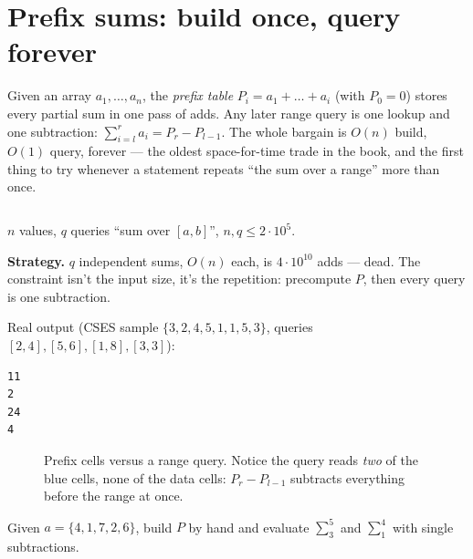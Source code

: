 \section{Prefix sums: build once, query forever}\label{sec:prefix}

Given an array $a_1, \dots, a_n$, the \emph{prefix table} $P_i = a_1 +
\dots + a_i$ (with $P_0 = 0$) stores every partial sum in one pass of
adds. Any later range query is one lookup and one subtraction:
$\sum_{i=l}^{r} a_i = P_r - P_{l-1}$. The whole bargain is $O(n)$ build,
$O(1)$ query, forever --- the oldest space-for-time trade in the book,
and the first thing to try whenever a statement repeats ``the sum over
a range'' more than once.

\begin{lstlisting}[language=C++,caption={\texttt{prefix.h}: 1D and 2D
prefix tables.},label={lst:prefix}]
\end{lstlisting}


\begin{example}\label{ex:rangesum}
$n$ values, $q$ queries ``sum over $[a,b]$'', $n,q \le 2\cdot10^5$.
\par\smallskip
\textbf{Strategy.} $q$ independent sums, $O(n)$ each, is $4\cdot10^{10}$
adds --- dead. The constraint isn't the input size, it's the repetition:
precompute $P$, then every query is one subtraction.
\par\smallskip
\begin{solution}

Real output (CSES sample $\{3,2,4,5,1,1,5,3\}$, queries
$[2,4],[5,6],[1,8],[3,3]$):
\begin{lstlisting}[numbers=none]
11
2
24
4
\end{lstlisting}
\end{solution}
\end{example}

\begin{figure}[ht]\centering

\caption{Prefix cells versus a range query. Notice the query reads
\emph{two} of the blue cells, none of the data cells: $P_r - P_{l-1}$
subtracts everything before the range at once.}
\label{fig:prefixsum}
\end{figure}

\begin{exercise}[easy]\label{exr:prefixcalc}
Given $a = \{4, 1, 7, 2, 6\}$, build $P$ by hand and evaluate
$\sum_{3}^{5}$ and $\sum_{1}^{4}$ with single subtractions.
\end{exercise}

